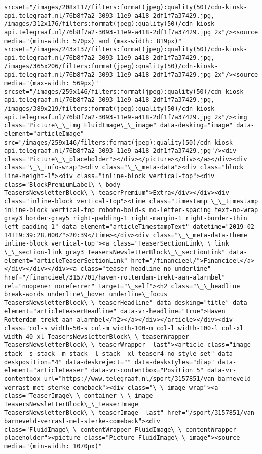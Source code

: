 \documentclass[11pt]{article}
\begin{document}
\begin{Verbatim}[commandchars=\\\{\}]
srcset="/images/208x117/filters:format(jpeg):quality(50)/cdn-kiosk-api.telegraaf.nl/76b8f7a2-3093-11e9-a418-2df1f7a37429.jpg, /images/312x176/filters:format(jpeg):quality(50)/cdn-kiosk-api.telegraaf.nl/76b8f7a2-3093-11e9-a418-2df1f7a37429.jpg 2x"/><source media="(min-width: 570px) and (max-width: 819px)" srcset="/images/243x137/filters:format(jpeg):quality(50)/cdn-kiosk-api.telegraaf.nl/76b8f7a2-3093-11e9-a418-2df1f7a37429.jpg, /images/365x206/filters:format(jpeg):quality(50)/cdn-kiosk-api.telegraaf.nl/76b8f7a2-3093-11e9-a418-2df1f7a37429.jpg 2x"/><source media="(max-width: 569px)" srcset="/images/259x146/filters:format(jpeg):quality(50)/cdn-kiosk-api.telegraaf.nl/76b8f7a2-3093-11e9-a418-2df1f7a37429.jpg, /images/389x219/filters:format(jpeg):quality(50)/cdn-kiosk-api.telegraaf.nl/76b8f7a2-3093-11e9-a418-2df1f7a37429.jpg 2x"/><img class="Picture\_\_img FluidImage\_\_image" data-desking="image" data-element="articleImage" src="/images/259x146/filters:format(jpeg):quality(50)/cdn-kiosk-api.telegraaf.nl/76b8f7a2-3093-11e9-a418-2df1f7a37429.jpg"/><div class="Picture\_\_placeholder"></div></picture></div></a></div><div class="\_\_info-wrap"><div class="\_\_meta-data"><div class="block line-height-1"><div class="inline-block vertical-top"><div class="BlockPremiumLabel\_\_body TeasersNewsletterBlock\_\_teaserPremium">Extra</div></div><div class="inline-block vertical-top"><time class="timestamp \_\_timestamp inline-block vertical-top roboto-bold-s no-letter-spacing text-no-wrap gray3 border-gray5 right-padding-1 right-margin-1 right-border-thin left-padding-1" data-element="articleTimestampText" datetime="2019-02-14T19:39:28.000Z">20:39</time></div><div class="\_\_meta-data-theme inline-block vertical-top"><a class="TeaserSectionLink\_\_link \_\_section-link gray3 TeasersNewsletterBlock\_\_sectionLink" data-element="articleTeaserSectionLink" href="/financieel/">Financieel</a></div></div></div><a class="teaser-headline no-underline" href="/financieel/3157701/haven-rotterdam-trekt-aan-alarmbel" rel="noopener noreferrer" target="\_self"><h2 class="\_\_headline break-words underline\_hover underline\_focus TeasersNewsletterBlock\_\_teaserHeadline" data-desking="title" data-element="articleTeaserHeadline" data-vr-headline="true">Haven Rotterdam trekt aan alarmbel</h2></a></div></article></div><div class="col-s width-50-s col-m width-100-m col-l width-100-l col-xl width-40-xl TeasersNewsletterBlock\_\_teaserWrapper TeasersNewsletterBlock\_\_teaserWrapper--last"><article class="image-stack--s stack--m stack--l stack--xl teaser4 no-style-set" data-deskposition="4" data-deskreject="" data-deskstyles="diap" data-element="articleTeaser" data-vr-contentbox="Position 5" data-vr-contentbox-url="https://www.telegraaf.nl/sport/3157851/van-barneveld-verrast-met-sterke-comeback"><div class="\_\_image-wrap"><a class="TeaserImage\_\_container \_\_image TeasersNewsletterBlock\_\_teaserImage TeasersNewsletterBlock\_\_teaserImage--last" href="/sport/3157851/van-barneveld-verrast-met-sterke-comeback"><div class="FluidImage\_\_contentWrapper FluidImage\_\_contentWrapper--placeholder"><picture class="Picture FluidImage\_\_image"><source media="(min-width: 1070px)" 
\end{Verbatim}
\end{document}
